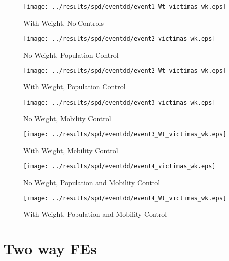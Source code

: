 \documentclass[11pt,letterpaper]{article}
\begin{document}
\begin{figure}[H]
\caption{With Weight, No Controls}
\centering
\texttt{[image: ../results/spd/eventdd/event1\_Wt\_victimas\_wk.eps]}
\end{figure}
\begin{figure}[hbtp]
\caption{No Weight, Population Control}
\centering
\texttt{[image: ../results/spd/eventdd/event2\_victimas\_wk.eps]}
\end{figure}

\begin{figure}[H]
\caption{With Weight, Population Control}
\centering
\texttt{[image: ../results/spd/eventdd/event2\_Wt\_victimas\_wk.eps]}
\end{figure}
\begin{figure}[H]
\caption{No Weight, Mobility Control}
\centering
\texttt{[image: ../results/spd/eventdd/event3\_victimas\_wk.eps]}
\end{figure}

\begin{figure}[H]
\caption{With Weight, Mobility Control}
\centering
\texttt{[image: ../results/spd/eventdd/event3\_Wt\_victimas\_wk.eps]}
\end{figure}
\begin{figure}[H]
\caption{No Weight, Population and Mobility Control}
\centering
\texttt{[image: ../results/spd/eventdd/event4\_victimas\_wk.eps]}
\end{figure}

\begin{figure}[H]
\caption{With Weight, Population and Mobility Control}
\centering
\texttt{[image: ../results/spd/eventdd/event4\_Wt\_victimas\_wk.eps]}
\end{figure}

\section{Two way FEs}
\end{document}
